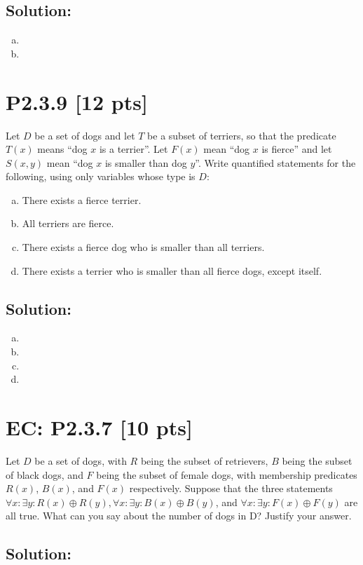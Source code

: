 \documentclass[12pt]{article}
\begin{document}
\subsection*{\textbf{Solution:}}
\begin{enumerate}[(a)]
    \item 

    \item
\end{enumerate}


\newpage
\section*{\textbf{P2.3.9} [12 pts]}
Let $D$ be a set of dogs and let $T$ be a subset of terriers, so that the predicate $T(x)$ means “dog $x$ is a terrier”. Let $F(x)$ mean “dog $x$ is fierce” and let $S(x, y)$ mean “dog $x$ is smaller than dog $y$”. Write quantified statements for the following, using only variables whose type is $D$:

\begin{enumerate}[(a)]
    \item There exists a fierce terrier.

    \item All terriers are fierce.

    \item There exists a fierce dog who is smaller than all terriers.

    \item There exists a terrier who is smaller than all fierce dogs, except itself.

\end{enumerate}


\subsection*{\textbf{Solution:}}
\begin{enumerate}[(a)]
    \item

    \item

    \item

    \item

\end{enumerate}


\newpage
\section*{\textbf{EC: P2.3.7} [10 pts]}
Let $D$ be a set of dogs, with $R$ being the subset of retrievers, $B$ being the subset of black dogs, and $F$ being the subset of female dogs, with membership predicates $R(x)$, $B(x)$, and $F(x)$ respectively. Suppose that the three statements $\forall x: \exists y: R(x) \oplus R(y), \forall x : \exists y : B(x) \oplus B(y)$, and $\forall x: \exists y: F(x) \oplus F(y)$ are all true. What can you say about the number of dogs in D? Justify your answer.


\subsection*{\textbf{Solution:}}
\end{document}
